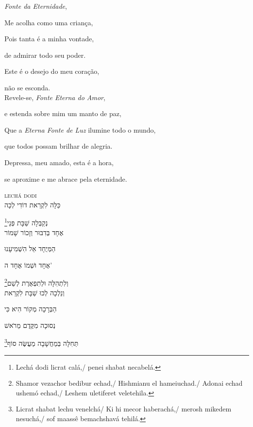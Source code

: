 \movetooddpage
\raggedright

\vspace*{1cm}

\emph{Fonte da Eternidade},

Me acolha como uma criança,

Pois tanta é a minha vontade,

de admirar todo seu poder.

Este é o desejo do meu coração,

não se esconda.\\[10pt]

Revele-se, \emph{Fonte Eterna do Amor},

e estenda sobre mim um manto de paz,

Que a \emph{Eterna Fonte de Luz} ilumine todo o mundo,

que todos possam brilhar de alegria.

Depressa, meu amado, esta é a hora,

se aproxime e me abrace pela eternidade.

\movetoevenpage
\raggedleft
{}\label{lecha}

\vspace*{1cm}

\textsc{lechá dodi}\\[15pt]

כַּלָּה לִקְרַאת דוֹדִי לְכָה

נְקַבְּלָה שַׁבָּת פְּנֵי\footnote{Lechá dodi licrat calá,/ penei shabat necabelá.}\\[10pt]

אֶחָד בְּדִבּוּר וְזָכוֹר שָׁמוֹר

הַמְּיֻחָד אֵל הִשְׁמִיעָנוּ

אֶחָד וּשְׁמוֹ אֶחָד ה' 

וְלִתְהִלָּה וּלְתִפְאֶרֶת לְשֵׁם\footnote{Shamor vezachor bedibur echad,/ Hishmianu el hameiuchad./ Adonai echad ushemó echad,/ Leshem uletiferet veletehila.}\\[10pt]

וְנֵלְכָה לְכוּ שַׁבָּת לִקְרַאת

הַבְּרָכָה מְקוֹר הִיא כִּי

נְסוּכָה מִקֶּדֶם מֵרֹאשׁ 

תְּחִלָּה בְּמַחֲשָׁבָה מַעֲשֶּׂה סוֹף\footnote{Licrat shabat lechu venelchá/ Ki hi mecor haberachá,/ merosh mikedem nesuchá,/ sof maassê bemachshavá tehilá.}\\[10pt]

